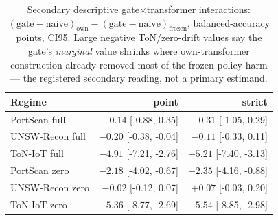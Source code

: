 \begin{table}
\centering
\caption{Secondary descriptive gate$\times$transformer interactions:
$(\mathrm{gate}-\mathrm{naive})_{\mathrm{own}} -
(\mathrm{gate}-\mathrm{naive})_{\mathrm{frozen}}$, balanced-accuracy points,
CI95. Large negative ToN/zero-drift values say the gate's \emph{marginal} value shrinks
where own-transformer construction already removed most of the frozen-policy harm --- the
registered secondary reading, not a primary estimand.}
\label{tab:symmetric_supp_interaction}
\small
\begin{tabular}{l r r}
\toprule
Regime & point & strict \\
\midrule
PortScan full & $-0.14$ [-0.88, 0.35] & $-0.31$ [-1.05, 0.29] \\
UNSW-Recon full & $-0.20$ [-0.38, -0.04] & $-0.11$ [-0.33, 0.11] \\
ToN-IoT full & $-4.91$ [-7.21, -2.76] & $-5.21$ [-7.40, -3.13] \\
PortScan zero & $-2.18$ [-4.02, -0.67] & $-2.35$ [-4.16, -0.88] \\
UNSW-Recon zero & $-0.02$ [-0.12, 0.07] & $+0.07$ [-0.03, 0.20] \\
ToN-IoT zero & $-5.36$ [-8.77, -2.69] & $-5.54$ [-8.85, -2.98] \\
\bottomrule
\end{tabular}
\end{table}
